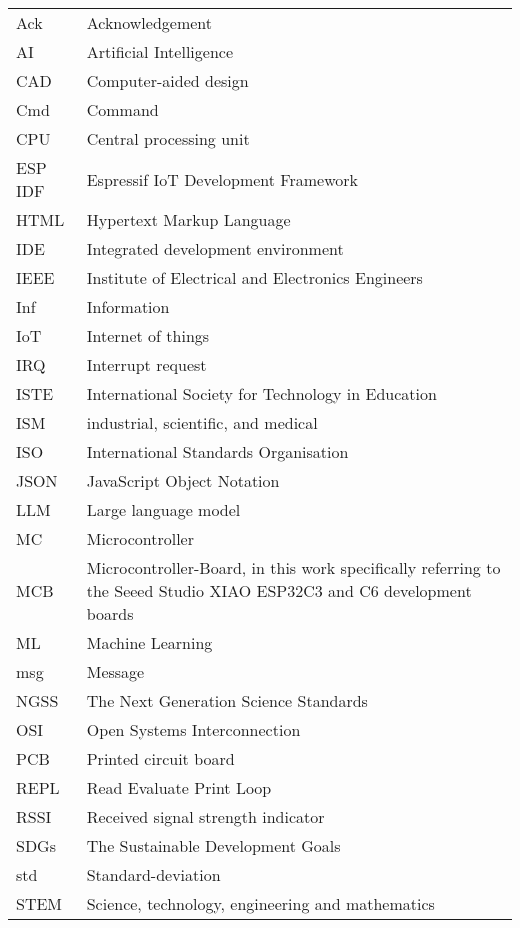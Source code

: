 {\begin{longtable}[h]{@{}p{} @{}p{}@{}}
Ack             & Acknowledgement \\
AI              & Artificial Intelligence \\
CAD				& Computer-aided design \\
Cmd             & Command \\
CPU             & Central processing unit \\
ESP IDF         & Espressif IoT Development Framework \\
HTML            & Hypertext Markup Language \\
IDE             & Integrated development environment \\
IEEE            & Institute of Electrical and Electronics Engineers \\
Inf             & Information \\
IoT             & Internet of things \\
IRQ             & Interrupt request \\
ISTE            & International Society for Technology in Education \\
ISM             & industrial, scientific, and medical \\
ISO             & International Standards Organisation \\
JSON            & JavaScript Object Notation \\
LLM             & Large language model \\
MC              & Microcontroller \\
MCB             & Microcontroller-Board, in this work specifically referring to the Seeed Studio XIAO ESP32C3 and C6 development boards \\
ML              & Machine Learning \\
msg             & Message \\
NGSS            & The Next Generation Science Standards \\
OSI             & Open Systems Interconnection \\
PCB             & Printed circuit board \\
REPL            & Read Evaluate Print Loop \\
RSSI            & Received signal strength indicator \\
SDGs            & The Sustainable Development Goals \\
std             & Standard-deviation \\
STEM            & Science, technology, engineering and mathematics \\

\end{longtable}}
